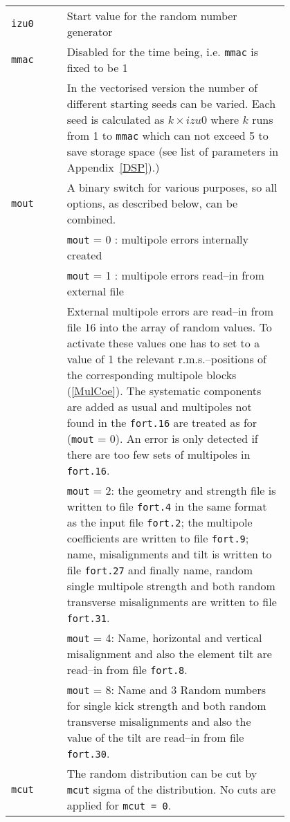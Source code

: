 \bigskip
\begin{longtabu}{@{}lp{0.8\linewidth}}
    \texttt{izu0} & Start value for the random number generator \\
    \texttt{mmac} & \textcolor{notered}{Disabled for the time being, i.e. \texttt{mmac} is fixed to be 1} \\
                  & In the vectorised version the number of different starting seeds can be varied. Each seed is calculated as \mbox{$ k \times izu0 $} where $k$ runs from 1 to \texttt{mmac} which can not exceed 5 to save storage space (see    list of parameters in Appendix~\ref{DSP}).) \\
    \texttt{mout} & A binary switch for various purposes, so all options, as described below, can be combined. \\
                  & \texttt{mout} = 0 : multipole errors internally created \\
                  & \texttt{mout} = 1 : multipole errors read--in from external file \\
                  & External multipole errors are read--in from file 16 into the array of random values. To activate these values one has to set to a value of 1 the relevant r.m.s.--positions of the corresponding multipole blocks (\ref{MulCoe}). The systematic components are added as usual and multipoles not found in the \texttt{fort.16} are treated as for (\texttt{mout} = 0). An error is only detected if there are too few sets of multipoles in \texttt{fort.16}. \\
                  & \texttt{mout} = 2: the geometry and strength file is written to file \texttt{fort.4} in the same format as the input file \texttt{fort.2}; the multipole coefficients are written to file \texttt{fort.9}; name, misalignments and tilt is written to file \texttt{fort.27} and finally name, random single multipole  strength and both random transverse misalignments are written to file \texttt{fort.31}.\\
                  & \texttt{mout} = 4: Name, horizontal and vertical misalignment and also the element tilt are read--in from file \texttt{fort.8}.\\
                  & \texttt{mout} = 8: Name and 3 Random numbers for single kick strength and both random transverse misalignments and also the value of the tilt are read--in from file \texttt{fort.30}. \\
    \texttt{mcut} & The random distribution can be cut by \texttt{mcut} sigma of the distribution. No cuts are applied for \texttt{mcut = 0}.
\end{longtabu}


